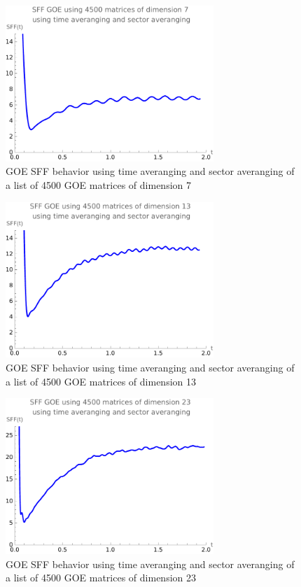 \documentclass[10pt,a4paper]{article}
\begin{document}
\begin{figure}[H]
    \centering
    \includegraphics[width=0.7\textwidth]{SFFGOETS7.pdf}
    \caption{GOE SFF behavior using time averanging and sector averanging of a list of 4500 GOE matrices of dimension 7}
    \label{fig:SFFGOETS7}
\end{figure}

\begin{figure}[H]
    \centering
    \includegraphics[width=0.7\textwidth]{SFFGOETS13.pdf}
    \caption{GOE SFF behavior using time averanging and sector averanging of a list of 4500 GOE matrices of dimension 13}
    \label{fig:SFFGOETS13}
\end{figure}

\begin{figure}[H]
    \centering
    \includegraphics[width=0.7\textwidth]{SFFGOETS.pdf}
    \caption{GOE SFF behavior using time averanging and sector averanging of a list of 4500 GOE matrices of dimension 23}
    \label{fig:SFFGOETS}
\end{figure}
\end{document}
